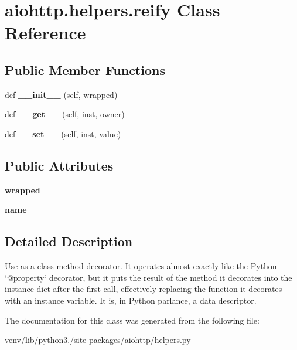 \hypertarget{classaiohttp_1_1helpers_1_1reify}{}\section{aiohttp.\+helpers.\+reify Class Reference}
\label{classaiohttp_1_1helpers_1_1reify}
\subsection*{Public Member Functions}
\begin{DoxyCompactItemize}
\item 
\mbox{\label{classaiohttp_1_1helpers_1_1reify_aaf0ec05a60fa1f624f4bfca4ce220f8e}} 
def {\bfseries \+\_\+\+\_\+init\+\_\+\+\_\+} (self, wrapped)
\item 
\mbox{\label{classaiohttp_1_1helpers_1_1reify_a4669668cd4be9486494b1ffd23fd0bf2}} 
def {\bfseries \+\_\+\+\_\+get\+\_\+\+\_\+} (self, inst, owner)
\item 
\mbox{\label{classaiohttp_1_1helpers_1_1reify_ace14b94787954692343cb33fc87ad135}} 
def {\bfseries \+\_\+\+\_\+set\+\_\+\+\_\+} (self, inst, value)
\end{DoxyCompactItemize}
\subsection*{Public Attributes}
\begin{DoxyCompactItemize}
\item 
\mbox{\label{classaiohttp_1_1helpers_1_1reify_af9d02b1806a408fc146d534b48655719}} 
{\bfseries wrapped}
\item 
\mbox{\label{classaiohttp_1_1helpers_1_1reify_ac0b6efa3d9d0681172ae9107449d9124}} 
{\bfseries name}
\end{DoxyCompactItemize}


\subsection{Detailed Description}
\begin{DoxyVerb}Use as a class method decorator.  It operates almost exactly like
the Python `@property` decorator, but it puts the result of the
method it decorates into the instance dict after the first call,
effectively replacing the function it decorates with an instance
variable.  It is, in Python parlance, a data descriptor.\end{DoxyVerb}
 

The documentation for this class was generated from the following file\+:\begin{DoxyCompactItemize}
\item 
venv/lib/python3./site-\/packages/aiohttp/helpers.\+py\end{DoxyCompactItemize}
